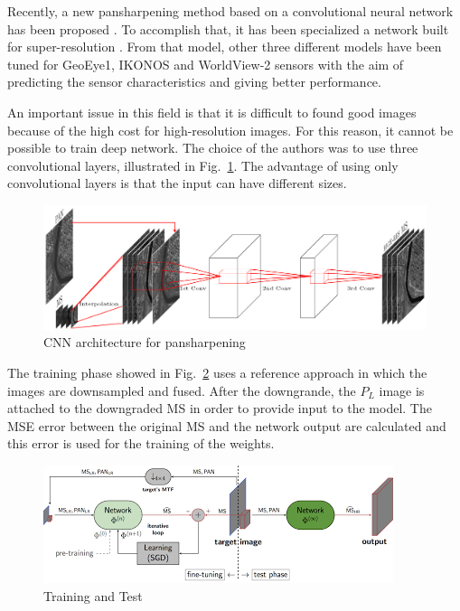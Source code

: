 \documentclass[12pt]{report}
\begin{document}
Recently, a new pansharpening method based on a convolutional neural network has been proposed \cite{pnn}.
To accomplish that, it has been specialized a network built for super-resolution \cite{superesolution}.
From that model, other three different models have been tuned for GeoEye1, IKONOS and WorldView-2 sensors
with the aim of predicting the sensor characteristics and giving better performance. 

An important issue in this field is that it is difficult to found good images because of the high cost for high-resolution images.
For this reason, it cannot be possible to train deep network. The choice of the authors was to use three convolutional layers, illustrated in Fig.~\ref{fig:dl-pnn}.
The advantage of using only convolutional layers is that the input can have different sizes.

\begin{figure}[t]
    \centering
    \includegraphics[scale=.8]{dl-pnn.png}
    \caption{CNN architecture for pansharpening\cite{pnn}}
    \label{fig:dl-pnn}
\end{figure}

The training phase showed in Fig.~\ref{fig:pnn-training} uses a reference approach in which the images are downsampled and fused. 
After the downgrande, the $P_L$ image is attached to the downgraded MS in order to provide input to the model.
The MSE error between the original MS and the network output are calculated and this error is used for the training of the weights.

\begin{figure}[t]
    \centering
    \includegraphics[scale=.9]{pnn-training.png}
    \caption{Training and Test\cite{pnn2}}
    \label{fig:pnn-training}
\end{figure}
\end{document}
